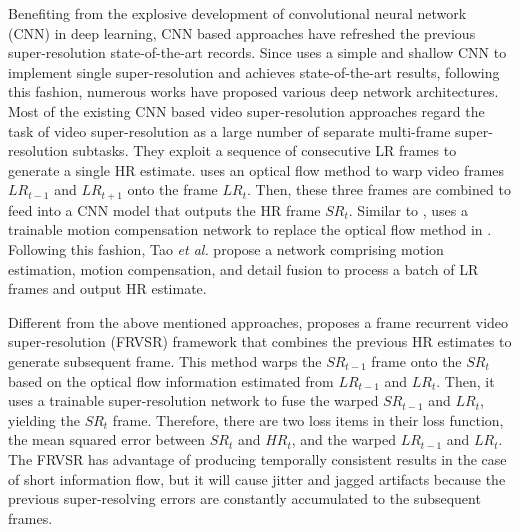 \documentclass[letterpaper]{article} %
\begin{document}
Benefiting from the explosive development of convolutional neural network (CNN) in deep learning, CNN based approaches have refreshed the previous super-resolution state-of-the-art records. Since \cite{Dong2014Learning} uses a simple and shallow CNN to implement single super-resolution and achieves state-of-the-art results, following this fashion, numerous works have proposed various deep network architectures. Most of the existing CNN based video super-resolution approaches regard the task of video super-resolution as a large number of separate multi-frame super-resolution subtasks. They exploit a sequence of consecutive LR frames to generate a single HR estimate. \cite{VSRNet2016TCT} uses an optical flow method to warp video frames $LR_{t-1}$ and $LR_{t+1}$ onto the frame $LR_t$. Then, these three frames are combined to feed into a CNN model that outputs the HR frame $SR_t$. Similar to \cite{VSRNet2016TCT}, \cite{VESPCN2017cvpr} uses a trainable motion compensation network to replace the optical flow method in \cite{VSRNet2016TCT}. Following this fashion, Tao \textit{et al.} \cite{Tao2017iccv} propose a network comprising motion estimation, motion compensation, and detail fusion to process a batch of LR frames and output HR estimate.


Different from the above mentioned approaches, \cite{FRVSR2018cvpr} proposes a frame recurrent video super-resolution (FRVSR) framework that combines the previous HR estimates to generate subsequent frame. This method warps the $SR_{t-1}$ frame onto the $SR_t$ based on the optical flow information estimated from $LR_{t-1}$ and $LR_{t}$. Then, it uses a trainable super-resolution network to fuse the warped $SR_{t-1}$ and $LR_{t}$, yielding the $SR_{t}$ frame. Therefore, there are two loss items in their loss function, the mean squared error between $SR_{t}$ and $HR_{t}$, and the warped $LR_{t-1}$ and $LR_{t}$. The FRVSR has advantage of producing temporally consistent results in the case of short information flow, but it will cause jitter and jagged artifacts because the previous super-resolving errors are constantly accumulated to the subsequent frames.
\end{document}
